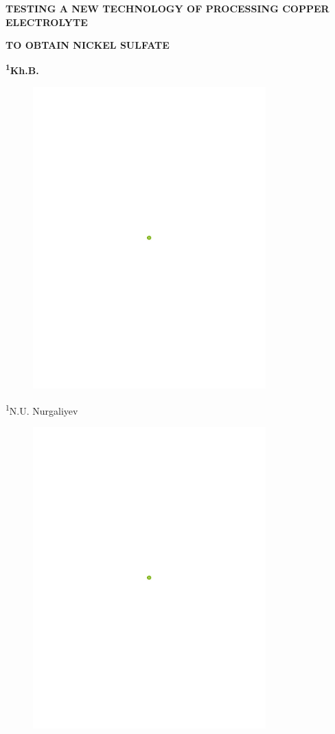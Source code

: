 
{\bfseries TESTING A NEW TECHNOLOGY OF PROCESSING COPPER ELECTROLYTE}

{\bfseries TO OBTAIN NICKEL SULFATE}

{\bfseries \textsuperscript{1}Kh.B.
\begin{figure}[H]
	\centering
	\includegraphics[width=0.8\textwidth]{media/chem2/image16}
	\caption*{}
\end{figure}

\textsuperscript{1}N.U. Nurgaliyev}
\begin{figure}[H]
	\centering
	\includegraphics[width=0.8\textwidth]{media/chem2/image16}
	\caption*{}
\end{figure}

